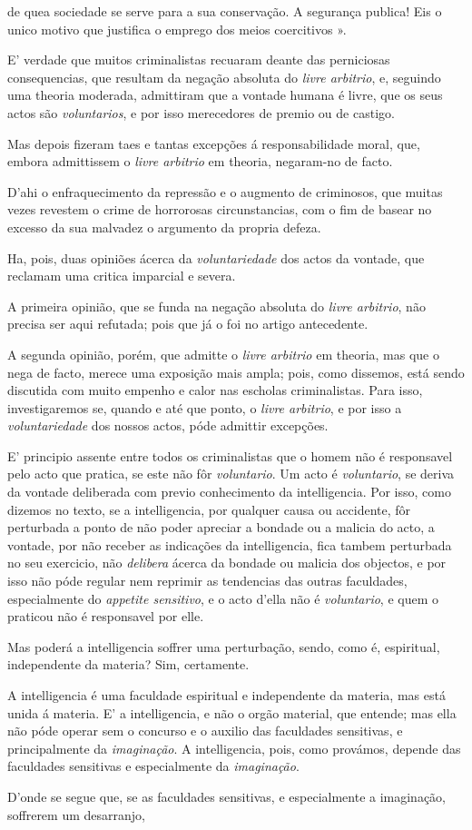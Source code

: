 de quea sociedade se serve para a sua conservação. A segurança publica! Eis o unico motivo que justifica o emprego dos meios coercitivos ».\par E' verdade que muitos criminalistas recuaram deante das perniciosas consequencias, que resultam da negação absoluta do \emph{livre arbitrio}, e, seguindo uma theoria moderada, admittiram que a vontade humana é livre, que os seus actos são \emph{voluntarios}, e por isso merecedores de premio ou de castigo.\par Mas depois fizeram taes e tantas excepções á responsabilidade moral, que, embora admittissem o \emph{livre arbitrio} em theoria, negaram-no de facto.\par D'ahi o enfraquecimento da repressão e o augmento de criminosos, que muitas vezes revestem o crime de horrorosas circunstancias, com o fim de basear no excesso da sua malvadez o argumento da propria defeza.\par Ha, pois, duas opiniões ácerca da \emph{voluntariedade} dos actos da vontade, que reclamam uma critica imparcial e severa.\par A primeira opinião, que se funda na negação absoluta do \emph{livre arbitrio}, não precisa ser aqui refutada; pois que já o foi no artigo antecedente.\par A segunda opinião, porém, que admitte o \emph{livre arbitrio} em theoria, mas que o nega de facto, merece uma exposição mais ampla; pois, como dissemos, está sendo discutida com muito empenho e calor nas escholas criminalistas. Para isso, investigaremos se, quando e até que ponto, o \emph{livre arbitrio}, e por isso a \emph{voluntariedade} dos nossos actos, póde admittir excepções.\par E' principio assente entre todos os criminalistas que o homem não é responsavel pelo acto que pratica, se este não fôr \emph{voluntario}. Um acto é \emph{voluntario}, se deriva da vontade deliberada com previo conhecimento da intelligencia. Por isso, como dizemos no texto, se a intelligencia, por qualquer causa ou accidente, fôr perturbada a ponto de não poder apreciar a bondade ou a malicia do acto, a vontade, por não receber as indicações da intelligencia, fica tambem perturbada no seu exercicio, não \emph{delibera} ácerca da bondade ou malicia dos objectos, e por isso não póde regular nem reprimir as tendencias das outras faculdades, especialmente do \emph{appetite sensitivo}, e o acto d'ella não é \emph{voluntario}, e quem o praticou não é responsavel por elle.\par Mas poderá a intelligencia soffrer uma perturbação, sendo, como é, espiritual, independente da materia? Sim, certamente.\par A intelligencia é uma faculdade espiritual e independente da materia, mas está unida á materia. E' a intelligencia, e não o orgão material, que entende; mas ella não póde operar sem o concurso e o auxilio das faculdades sensitivas, e principalmente da \emph{imaginação}. A intelligencia, pois, como provámos, depende das faculdades sensitivas e especialmente da \emph{imaginação}.\par D'onde se segue que, se as faculdades sensitivas, e especialmente a imaginação, soffrerem um desarranjo, 
